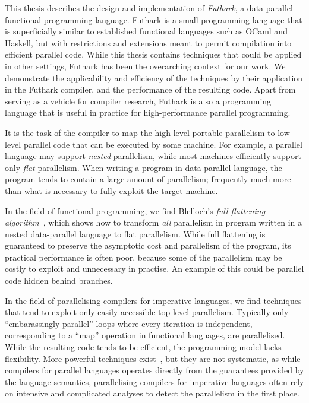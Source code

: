 
This thesis describes the design and implementation of
\textit{Futhark}, a data parallel functional programming language.
Futhark is a small programming language that is superficially similar
to established functional languages such as OCaml and Haskell, but
with restrictions and extensions meant to permit compilation into
efficient parallel code.  While this thesis contains techniques that
could be applied in other settings, Futhark has been the overarching
context for our work.  We demonstrate the applicability and efficiency
of the techniques by their application in the Futhark compiler, and
the performance of the resulting code.  Apart from serving as a
vehicle for compiler research, Futhark is also a programming language
that is useful in practice for high-performance parallel programming.

It is the task of the compiler to map the high-level portable
parallelism to low-level parallel code that can be executed by some
machine.  For example, a parallel language may support \textit{nested}
parallelism, while most machines efficiently support only
\textit{flat} parallelism.  When writing a program in data parallel
language, the program tends to contain a large amount of parallelism;
frequently much more than what is necessary to fully exploit the
target machine.

In the field of functional programming, we find Blelloch's
\textit{full flattening algorithm}~\cite{blelloch1994implementation},
which shows how to transform \textit{all} parallelism in program
written in a nested data-parallel language to flat parallelism.  While
full flattening is guaranteed to preserve the asymptotic cost and
parallelism of the program, its practical performance is often poor,
because some of the parallelism may be costly to exploit and
unnecessary in practise.  An example of this could be parallel code
hidden behind branches.

In the field of parallelising compilers for imperative languages, we
find techniques that tend to exploit only easily accessible top-level
parallelism.  Typically only ``embarassingly parallel'' loops where
every iteration is independent, corresponding to a ``map'' operation
in functional languages, are parallelised.  While the resulting code
tends to be efficient, the programming model lacks flexibility.  More
powerful techniques exist~\cite{PolyhedralOpt}, but they are not
systematic, as while compilers for parallel languages operates
directly from the guarantees provided by the language semantics,
parallelising compilers for imperative languages often rely on
intensive and complicated analyses to detect the parallelism in the
first place.

